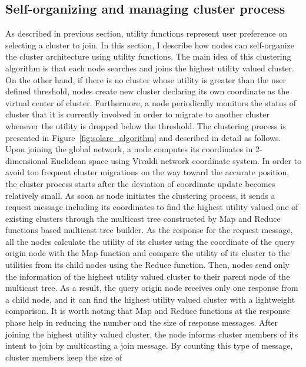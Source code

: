 \subsection{Self-organizing and managing cluster process}
\label{solare:clusterprocess}
As described in previous section, utility functions represent user
preference on selecting a cluster to join.
%
In this section, I describe how nodes can self-organize the cluster
architecture using utility functions.
%
The main idea of this clustering algorithm is that each node searches
and joins the highest utility valued cluster.
%
On the other hand, if there is no cluster whose utility is greater than
the user defined threshold, nodes create new cluster declaring its own
coordinate as the virtual center of cluster.
%
Furthermore, a node periodically monitors the status of cluster that it
is currently involved in order to migrate to another cluster whenever
the utility is dropped below the threshold.
%
The clustering process is presented in Figure~\ref{fig:solare_algorithm} 
and described in detail as follows.\\
%
Upon joining the global network, a node computes its coordinates in
2-dimensional Euclidean space using Vivaldi network coordinate system.
%
In order to avoid too frequent cluster migrations on the way toward the
accurate position, the cluster process starts after the deviation of
coordinate update becomes relatively small.
%
As soon as node initiates the clustering process, it sends a request
message including its coordinates to find the highest utility valued one
of existing clusters through the multicast tree constructed by Map and
Reduce functions based multicast tree builder.
%
As the response for the request message, all the nodes calculate the
utility of its cluster using the coordinate of the query origin node
with the Map function and compare the utility of its cluster to the
utilities from its child nodes using the Reduce function.
%
Then, nodes send only the information of the highest utility valued
cluster to their parent node of the multicast tree.
%
As a result, the query origin node receives only one response from a
child node, and it can find the highest utility valued cluster with a
lightweight comparison.
%
It is worth noting that Map and Reduce functions at the response phase
help in reducing the number and the size of response messages.
%
After joining the highest utility valued cluster, the node informs
cluster members of its intent to join by multicasting a join message.
%
By counting this type of message, cluster members keep the size of
